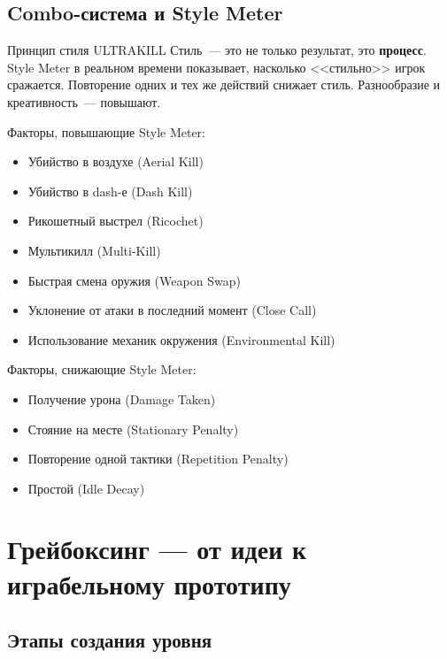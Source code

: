 \documentclass[a4paper,11pt]{report}
\begin{document}
\section{Combo-система и Style Meter}

\begin{principle}{Принцип стиля ULTRAKILL}
Стиль~--- это не только результат, это \textbf{процесс}. Style Meter
в реальном времени показывает, насколько <<стильно>> игрок сражается.
Повторение одних и тех же действий снижает стиль.
Разнообразие и креативность~--- повышают.
\end{principle}

Факторы, повышающие Style Meter:
\begin{itemize}[leftmargin=*]
  \item Убийство в воздухе (Aerial Kill)
  \item Убийство в dash-е (Dash Kill)
  \item Рикошетный выстрел (Ricochet)
  \item Мультикилл (Multi-Kill)
  \item Быстрая смена оружия (Weapon Swap)
  \item Уклонение от атаки в последний момент (Close Call)
  \item Использование механик окружения (Environmental Kill)
\end{itemize}

Факторы, снижающие Style Meter:
\begin{itemize}[leftmargin=*]
  \item Получение урона (Damage Taken)
  \item Стояние на месте (Stationary Penalty)
  \item Повторение одной тактики (Repetition Penalty)
  \item Простой (Idle Decay)
\end{itemize}


\chapter{Грейбоксинг --- от идеи к играбельному прототипу}

\section{Этапы создания уровня}
\end{document}

